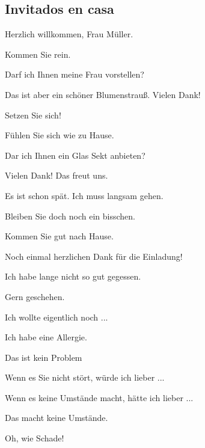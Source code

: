 \subsection{Invitados en casa}
\begin{myitemize}
\item Herzlich willkommen, Frau Müller.
\item Kommen Sie rein.
\item Darf ich Ihnen meine Frau vorstellen?
\item Das ist aber ein schöner Blumenstrauß. Vielen Dank!
\item Setzen Sie sich!
\item Fühlen Sie sich wie zu Hause.
\item Dar ich Ihnen ein Glas Sekt anbieten?
\item Vielen Dank! Das freut uns.
\item Es ist schon spät. Ich muss langsam gehen.
\item Bleiben Sie doch noch ein bisschen.
\item Kommen Sie gut nach Hause.
\item Noch einmal herzlichen Dank für die Einladung!
\item Ich habe lange nicht so gut gegessen.
\item Gern geschehen.
\item Ich wollte eigentlich noch ...
\item Ich habe eine Allergie.
\item Das ist kein Problem
\item Wenn es Sie nicht stört, würde ich lieber ...
\item Wenn es keine Umstände macht, hätte ich lieber ...
\item Das macht keine Umstände.
\item Oh, wie Schade!
\end{myitemize}

